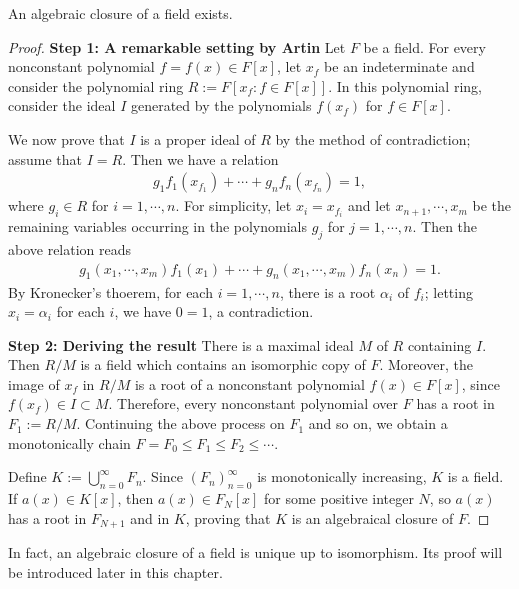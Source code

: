 \begin{thm}
    An algebraic closure of a field exists.
\end{thm}
\begin{proof}
    \textbf{Step 1: A remarkable setting by Artin}\newline\noindent
    Let $F$ be a field.
    For every nonconstant polynomial $f=f(x)\in F[x]$, let $x_f$ be an indeterminate and consider the polynomial ring $R:=F[x_f: f\in F[x]]$.
    In this polynomial ring, consider the ideal $I$ generated by the polynomials $f(x_f)$ for $f\in F[x]$.

    We now prove that $I$ is a proper ideal of $R$ by the method of contradiction; assume that $I=R$.
    Then we have a relation
    \begin{align*}
        g_1f_1(x_{f_1})+\cdots+g_nf_n(x_{f_n})=1,
    \end{align*}
    where $g_i\in R$ for $i=1, \cdots, n$.
    For simplicity, let $x_i=x_{f_i}$ and let $x_{n+1}, \cdots, x_m$ be the remaining variables occurring in the polynomials $g_j$ for $j=1, \cdots, n$.
    Then the above relation reads
    \begin{align*}
        g_1(x_1, \cdots, x_m)f_1(x_1)+\cdots+g_n(x_1, \cdots, x_m)f_n(x_n)=1.
    \end{align*}
    By Kronecker's thoerem, for each $i=1, \cdots, n$, there is a root $\alpha_i$ of $f_i$; letting $x_i=\alpha_i$ for each $i$, we have $0=1$, a contradiction.

    \textbf{Step 2: Deriving the result}\newline\noindent
    There is a maximal ideal $M$ of $R$ containing $I$.
    Then $R/M$ is a field which contains an isomorphic copy of $F$.
    Moreover, the image of $x_f$ in $R/M$ is a root of a nonconstant polynomial $f(x)\in F[x]$, since $f(x_f)\in I\subset M$.
    Therefore, every nonconstant polynomial over $F$ has a root in $F_1:=R/M$.
    Continuing the above process on $F_1$ and so on, we obtain a monotonically chain $F=F_0\leq F_1\leq F_2\leq \cdots$.

    Define $K:=\bigcup_{n=0}^\infty F_n$.
    Since $(F_n)_{n=0}^\infty$ is monotonically increasing, $K$ is a field.
    If $a(x)\in K[x]$, then $a(x)\in F_N[x]$ for some positive integer $N$, so $a(x)$ has a root in $F_{N+1}$ and in $K$, proving that $K$ is an algebraical closure of $F$.
\end{proof}

In fact, an algebraic closure of a field is unique up to isomorphism.
Its proof will be introduced later in this chapter.